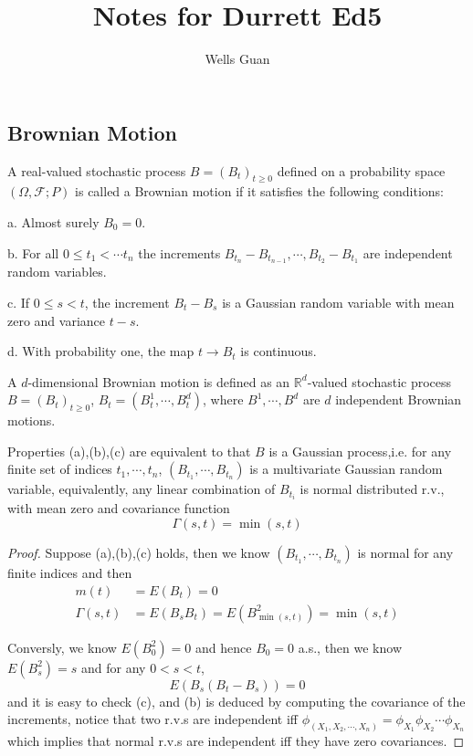 \documentclass[lang=en, color=blue, ]{elegantbook}
\title{Notes for Durrett Ed5}
\author{Wells Guan}
\newcommand{\F}{\mathcal{F}}
\newcommand{\R}{\mathbb{R}}
\begin{document}


\chapter{}
\section{Brownian Motion}

\begin{definition}
A real-valued stochastic process $B=(B_t)_{t\geq 0}$ defined on a probability space $(\Omega,\F;P)$ is called a Brownian motion if it satisfies the following conditions:\par
a. Almost surely $B_0 = 0$.\par
b. For all $0\leq t_1 < \cdots t_n$ the increments $B_{t_n}-B_{t_{n-1}},\cdots,B_{t_2}-B_{t_1}$ are independent random variables.\par
c. If $0\leq s < t$, the increment $B_t-B_s$ is a Gaussian random variable with mean zero and variance $t-s$.\par
d. With probability one, the map $t\to B_t$ is continuous.\par
A $d$-dimensional Brownian motion is defined as an $\R^d$-valued stochastic process $B=(B_t)_{t\geq 0}$, $B_t = (B_t^1,\cdots,B_t^d)$, where $B^1,\cdots,B^d$ are $d$ independent Brownian motions.
\end{definition}

\begin{proposition}
    Properties (a),(b),(c) are equivalent to that $B$ is a Gaussian process,i.e. for any finite set of indices $t_1,\cdots,t_n$, $(B_{t_1},\cdots,B_{t_n})$ is a multivariate Gaussian random variable, equivalently, any linear combination of $B_{t_i}$ is normal distributed r.v., with mean zero and covariance function
    \[\Gamma(s,t) = \min(s,t)\]
\end{proposition}
\begin{proof}\par
    Suppose (a),(b),(c) holds, then we know $(B_{t_1},\cdots,B_{t_n})$ is normal for any finite indices and then
    \[
    \begin{aligned}
        m(t) &= E(B_t) = 0\\
        \Gamma(s,t)&=E(B_sB_t) =E(B_{\min(s,t)}^2) = \min(s,t) 
    \end{aligned}
    \]\par
    Conversly, we know $E(B_0^2) = 0$ and hence $B_0 = 0$ a.s., then we know $E(B_s^2) = s$ and for any $0<s<t$,
    \[
    E(B_s(B_t-B_s)) = 0
    \]
    and it is easy to check (c), and (b) is deduced by computing the covariance of the increments, notice that two r.v.s are independent iff $\phi_{(X_1,X_2,\cdots,X_n)} = \phi_{X_1}\phi_{X_2}\cdots\phi_{X_n}$ which implies that normal r.v.s are independent iff they have zero covariances.
\end{proof}
\end{document}
